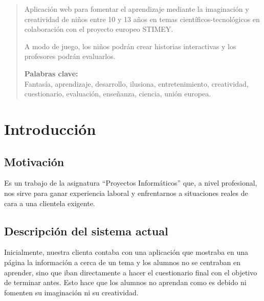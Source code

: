 \documentclass[12pt,letterpaper]{article}
\begin{document}
	\begin{abstract} %
		Aplicación web para fomentar el aprendizaje mediante la imaginación y creatividad de niños entre 10 y 13 años en temas científicos-tecnológicos en colaboración con el proyecto europeo STIMEY.
		
		A modo de juego, los niños podrán crear historias interactivas y los profesores podrán evaluarlos.
		
		\textbf{Palabras clave:}\\
		Fantasía, aprendizaje, desarrollo, ilusiona, entretenimiento, creatividad, cuestionario, evaluación, enseñanza, ciencia, unión europea.
	\end{abstract}

	\thispagestyle{empty}
	\newpage
	
	\tableofcontents
	\newpage
	
	
	
	
	\lstset{language=bash, numbers=left, numberstyle=\tiny, numbersep=10pt, firstnumber=1, stepnumber=1, basicstyle=\small\ttfamily, tabsize=1, extendedchars=true, inputencoding=latin1}

\section{Introducción}
\subsection{Motivación}
Es un trabajo de la asignatura ``Proyectos Informáticos'' que, a nivel profesional, nos sirve para ganar experiencia laboral y enfrentarnos a situaciones reales de cara a una clientela exigente.

\subsection{Descripción del sistema actual}
Inicialmente, nuestra clienta contaba con una aplicación que mostraba en una página la información a cerca de un tema y los alumnos no se centraban en aprender, sino que iban directamente a hacer el cuestionario final con el objetivo de terminar antes. Esto hace que los alumnos no aprendan como es debido ni fomenten su imaginación ni su creatividad.
\end{document}
